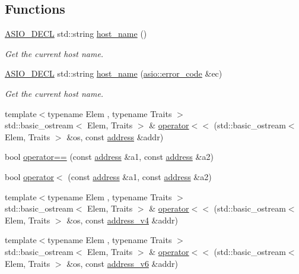 \subsection*{Functions}
\begin{DoxyCompactItemize}
\item 
\hyperlink{config_8hpp_ab54d01ea04afeb9a8b39cfac467656b7}{A\+S\+I\+O\+\_\+\+D\+E\+C\+L} std\+::string \hyperlink{namespaceasio_1_1ip_a9fb69e400d86dec2d2523bd63a103e76}{host\+\_\+name} ()
\begin{DoxyCompactList}\small\item\em Get the current host name. \end{DoxyCompactList}\item 
\hyperlink{config_8hpp_ab54d01ea04afeb9a8b39cfac467656b7}{A\+S\+I\+O\+\_\+\+D\+E\+C\+L} std\+::string \hyperlink{namespaceasio_1_1ip_a445bc3ef2239d953e73308d62244a8ad}{host\+\_\+name} (\hyperlink{classasio_1_1error__code}{asio\+::error\+\_\+code} \&ec)
\begin{DoxyCompactList}\small\item\em Get the current host name. \end{DoxyCompactList}\item 
{\footnotesize template$<$typename Elem , typename Traits $>$ }\\std\+::basic\+\_\+ostream$<$ Elem, Traits $>$ \& \hyperlink{namespaceasio_1_1ip_ada0ef694247ead1bbc6f93c99b43ed70}{operator$<$$<$} (std\+::basic\+\_\+ostream$<$ Elem, Traits $>$ \&os, const \hyperlink{classasio_1_1ip_1_1address}{address} \&addr)
\item 
bool \hyperlink{namespaceasio_1_1ip_ac81a73710f560ec78c381a7e4e23836f}{operator==} (const \hyperlink{classasio_1_1ip_1_1address}{address} \&a1, const \hyperlink{classasio_1_1ip_1_1address}{address} \&a2)
\item 
bool \hyperlink{namespaceasio_1_1ip_a71d4ba892e407bde46ae6d9ea712b82f}{operator$<$} (const \hyperlink{classasio_1_1ip_1_1address}{address} \&a1, const \hyperlink{classasio_1_1ip_1_1address}{address} \&a2)
\item 
{\footnotesize template$<$typename Elem , typename Traits $>$ }\\std\+::basic\+\_\+ostream$<$ Elem, Traits $>$ \& \hyperlink{namespaceasio_1_1ip_a1b6384055fd5a1c9793aff31d41cfdac}{operator$<$$<$} (std\+::basic\+\_\+ostream$<$ Elem, Traits $>$ \&os, const \hyperlink{classasio_1_1ip_1_1address__v4}{address\+\_\+v4} \&addr)
\item 
{\footnotesize template$<$typename Elem , typename Traits $>$ }\\std\+::basic\+\_\+ostream$<$ Elem, Traits $>$ \& \hyperlink{namespaceasio_1_1ip_a3ce9566fd8c54aa4c3ecd93abf3d1510}{operator$<$$<$} (std\+::basic\+\_\+ostream$<$ Elem, Traits $>$ \&os, const \hyperlink{classasio_1_1ip_1_1address__v6}{address\+\_\+v6} \&addr)

\end{DoxyCompactItemize}

